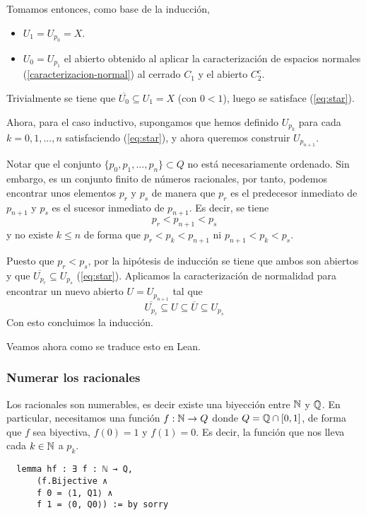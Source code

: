 Tomamos entonces, como base de la inducción,

\begin{itemize}
  \item $U_1 = U_{p_0} = X$.
  \item $U_0 = U_{p_1}$ el abierto obtenido al aplicar la caracterización de espacios normales (\ref{caracterizacion-normal}) al cerrado $C_1$ y el abierto $C_2^c$.
\end{itemize}

Trivialmente se tiene que $\overline{U_0} \subseteq U_1 = X$ (con $0<1$), luego se satisface (\ref{eq:star}).

Ahora, para el caso inductivo, supongamos que hemos definido $U_{p_k}$ para cada $k = 0, 1, ..., n$ satisfaciendo (\ref{eq:star}), y ahora queremos construir $U_{p_{n+1}}$.

Notar que el conjunto $\{p_0, p_1, ..., p_n\} \subset Q$ no está necesariamente ordenado. Sin embargo, es un conjunto finito de números racionales, por tanto, podemos encontrar unos elementos $p_r$ y $p_s$ de manera que $p_r$ es el predecesor inmediato de $p_{n+1}$ y $p_s$ es el sucesor inmediato de $p_{n+1}$. Es decir, se tiene
$$
p_r < p_{n+1} < p_s
$$
y no existe $k\leq n$ de forma que $p_r < p_k < p_{n+1}$ ni $p_{n+1} < p_k < p_s$.

Puesto que $p_r < p_s$, por la hipótesis de inducción se tiene que ambos son abiertos y que $\overline{U_{p_r}} \subseteq U_{p_s}$ (\ref{eq:star}). Aplicamos la caracterización de normalidad para encontrar un nuevo abierto $U = U_{p_{n+1}}$ tal que
$$
\overline{U_{p_r}} \subseteq U \subseteq \overline{U} \subseteq U_{p_s}
$$
Con esto concluimos la inducción.

Veamos ahora como se traduce esto en Lean.

\subsubsection{Numerar los racionales}

Los racionales son numerables, es decir existe una biyección entre $\mathbb{N}$ y $\mathbb{Q}$. En particular, necesitamos una función $f : \mathbb{N} \to Q$ donde $Q = \mathbb{Q} \cap [0, 1]$, de forma que $f$ sea biyectiva, $f(0) = 1$ y $f(1) = 0$. Es decir, la función que nos lleva cada $k \in \mathbb{N}$ a $p_k$.

\begin{lstlisting}
  lemma hf : ∃ f : ℕ → Q,
      (f.Bijective ∧
      f 0 = ⟨1, Q1⟩ ∧
      f 1 = ⟨0, Q0⟩) := by sorry
\end{lstlisting}

